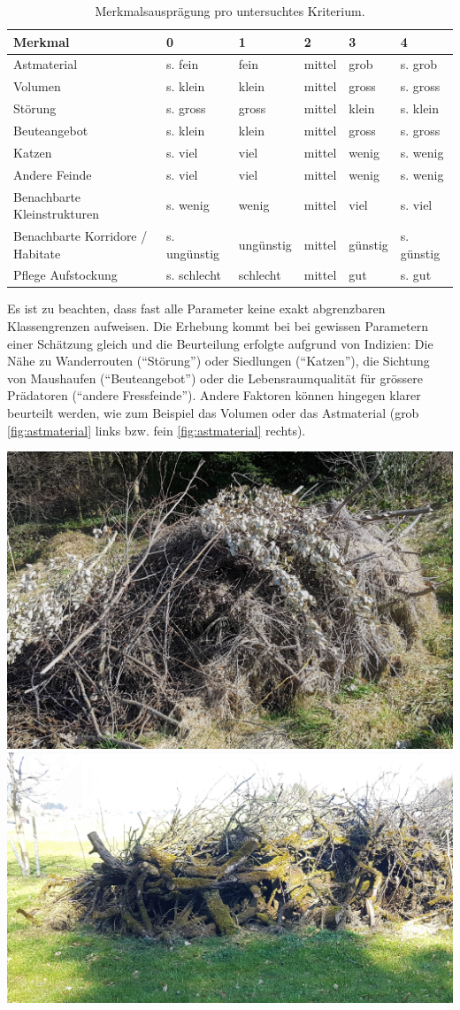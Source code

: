 \documentclass[
  oneside]{scrbook}
\begin{document}
\begin{table}

\caption{\label{tab:unnamed-chunk-3}Merkmalsausprägung pro untersuchtes Kriterium.}
\centering
\begin{tabular}[t]{l|l|l|l|l|l}
\hline
Merkmal & 0 & 1 & 2 & 3 & 4\\
\hline
Astmaterial & s. fein & fein & mittel & grob & s. grob\\
\hline
Volumen & s. klein & klein & mittel & gross & s. gross\\
\hline
Störung & s. gross & gross & mittel & klein & s. klein\\
\hline
Beuteangebot & s. klein & klein & mittel & gross & s. gross\\
\hline
Katzen & s. viel & viel & mittel & wenig & s. wenig\\
\hline
Andere Feinde & s. viel & viel & mittel & wenig & s. wenig\\
\hline
Benachbarte Kleinstrukturen & s. wenig & wenig & mittel & viel & s. viel\\
\hline
Benachbarte Korridore / Habitate & s. ungünstig & ungünstig & mittel & günstig & s. günstig\\
\hline
Pflege Aufstockung & s. schlecht & schlecht & mittel & gut & s. gut\\
\hline
\end{tabular}
\end{table}

Es ist zu beachten, dass fast alle Parameter keine exakt abgrenzbaren Klassengrenzen aufweisen. Die Erhebung kommt bei bei gewissen Parametern einer Schätzung gleich und die Beurteilung erfolgte aufgrund von Indizien: Die Nähe zu Wanderrouten (``Störung'') oder Siedlungen (``Katzen''), die Sichtung von Maushaufen (``Beuteangebot'') oder die Lebensraumqualität für grössere Prädatoren (``andere Fressfeinde'').
Andere Faktoren können hingegen klarer beurteilt werden, wie zum Beispiel das Volumen oder das Astmaterial (grob \ref{fig:astmaterial} links bzw. fein \ref{fig:astmaterial} rechts).

\includegraphics[width=0.49\linewidth]{images/feines_astmaterial}
\includegraphics[width=0.49\linewidth]{images/grobes_astmaterial}
\end{document}

